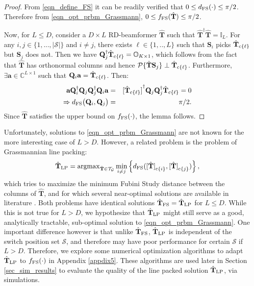 \documentclass[journal,comsoc]{IEEEtran}
\begin{document}
\begin{proof}
From \eqref{eqn_define_FS} it can be readily verified that $0 \leq d_{\rm FS}(\cdot) \leq \pi/2$. Therefore from \eqref{eqn_opt_prbm_Grassmann}, $0 \leq f_{\rm FS}(\hat{\mathbf{T}}) \leq \pi/2$. 

Now, for $L \leq D$, consider a $D\times L$ RD-beamformer $\hat{\mathbf{T}}$ such that $\hat{\mathbf{T}}^{\dag} \hat{\mathbf{T}} = \mathbb{I}_L$. For any $i,j \in \{1,..., |\mathcal{S}|\}$ and $i \neq j$, there exists $\ell \in \{1,.., L\}$ such that $\mathbf{S}_i$ picks $\hat{\mathbf{T}}_{{\rm c}\{\ell\}}$ but $\mathbf{S}_j$ does not. Then we have $\mathbf{Q}_j^{\dag} \hat{\mathbf{T}}_{{\rm c}\{\ell\}} = \mathbb{O}_{K \times 1}$, which follows from the fact that $\hat{\mathbf{T}}$ has orthonormal columns and hence $\mathcal{P}\{\hat{\mathbf{T}}\mathbf{S}_j \} \perp \hat{\mathbf{T}}_{{\rm c}\{\ell\}}$. Furthermore,
$\exists \mathbf{a} \in \mathbb{C}^{L \times 1}$ such that $\mathbf{Q}_i \mathbf{a} = \hat{\mathbf{T}}_{{\rm c}\{\ell\}}$. Then:
\begin{eqnarray}
\mathbf{a} \mathbf{Q}_i^{\dag} \mathbf{Q}_j \mathbf{Q}_j^{\dag} \mathbf{Q}_i \mathbf{a} &=& {[\hat{\mathbf{T}}_{{\rm c}\{\ell\}}]}^{\dag} \mathbf{Q}_j \mathbf{Q}_j^{\dag} \hat{\mathbf{T}}_{{\rm c}\{\ell\}} = 0 \nonumber \\
\Rightarrow d_{\rm FS} \big( \mathbf{Q}_i, \mathbf{Q}_j \big) &=& \pi/2.
\end{eqnarray}
Since $\hat{\mathbf{T}}$ satisfies the upper bound on $f_{\rm FS}(\cdot)$, the lemma follows. 
%
\end{proof}
Unfortunately, solutions to \eqref{eqn_opt_prbm_Grassmann} are not known for the more interesting case of $L > D$. However, a related problem is the problem of Grassmannian line packing:
\begin{eqnarray}
\hat{\mathbf{T}}_{\rm LP} = {\rm argmax}_{\hat{\mathbf{T}} \in \mathcal{T}_{\mathcal{G}}} \min_{i \neq j}\left \{ d_{\rm FS}({[\hat{\mathbf{T}}]}_{{\rm c}\{i\}}, {[\hat{\mathbf{T}}]}_{{\rm c}\{j\}}) \right \}, \label{eqn_opt_prbm_linepacking}
\end{eqnarray}
which tries to maximize the minimum Fubini Study distance between the columns of $\hat{\mathbf{T}}$, and for which several near-optimal solutions are available in literature \cite{Medra2014, Dhillon2008}. Both problems have identical solutions $\hat{\mathbf{T}}_{\rm FS} = \hat{\mathbf{T}}_{\rm LP}$ for $L \leq D$. 
%
%
While this is not true for $L > D$, we hypothesize that $\hat{\mathbf{T}}_{\rm LP}$ might still serve as a good, analytically tractable, sub-optimal solution to \eqref{eqn_opt_prbm_Grassmann}. One important difference however is that unlike $\hat{\mathbf{T}}_{\rm FS}$, $\hat{\mathbf{T}}_{\rm LP}$ is independent of the switch position set $\mathcal{S}$, and therefore may have poor performance for certain $\mathcal{S}$ if $L > D$. Therefore, we explore some numerical optimization algorithms to adapt $\hat{\mathbf{T}}_{\rm LP}$ to $f_{\rm FS}(\cdot)$ in Appendix \ref{appdix5}. These algorithms are used later in Section \ref{sec_sim_results} to evaluate the quality of the line packed solution $\hat{\mathbf{T}}_{\rm LP}$, via simulations. 
%
%
\end{document}
